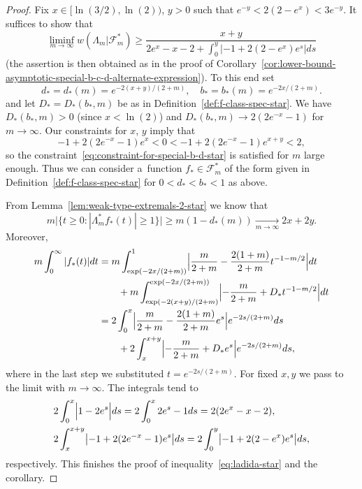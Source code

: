 \documentclass[a4paper]{amsart} %
\theoremstyle{definition}
\theoremstyle{remark}
\numberwithin{equation}{section}
\newcommand*{\weakconstrestricted}[2]{w(#1|#2)} %
\newcommand*{\fclassspecStar}[1]{\mathcal{F}_{#1}^*}
\newcommand*{\fStar}{f_{*}}
\newcommand*{\bStar}{b_*}
\newcommand*{\dStar}{d_*}
\newcommand*{\dOneStar}{D_*}%
\newcommand*{\xStar}{x}
\newcommand*{\yStar}{y}
\begin{document}
\begin{proof}
	Fix $x\in [\ln(3/2), \ln(2))$, $y>0$ such that $e^{-y} < 2(2-e^x) <  3e^{-y}$.
	It suffices to show that
	\begin{equation}
	\label{eq:ladida-star}
	\liminf_{m\to \infty} \weakconstrestricted{\Lambda_m}{\fclassspecStar{m}}
	\geq 	\frac{x + y }{2e^x - x -2+\int_0^y |-1 + 2(2-e^x) e^s | ds}
	\end{equation}
    (the assertion is then obtained as in the proof of Corollary~\ref{cor:lower-bound-asymptotic-special-b-c-d-alternate-expression}).
	To this end set
	\begin{equation*}
	\dStar = \dStar(m) = e^{-2(\xStar+\yStar)/(2+m)},\quad
	\bStar = \bStar(m) = e^{-2\xStar/(2+m)}.
	\end{equation*}
	and let $\dOneStar = \dOneStar(\bStar,m)$ be as in Definition~\ref{def:f-class-spec-star}.
	We have $\dOneStar(\bStar,m) > 0$ (since $x<\ln(2)$)
	and
	$\dOneStar(\bStar,m)\to 2(2e^{-x} -1)$ for $m\to\infty$.
	Our constraints for $x$, $y$ imply that
	\begin{equation*}
	-1 + 2(2e^{-x} - 1) e^x < 0 <  -1 + 2(2e^{-x} - 1) e^{x+y} < 2,
	\end{equation*}	
	so the constraint~\eqref{eq:constraint-for-special-b-d-star} is satisfied for $m$ large enough.
	Thus we can consider a~function $\fStar\in\fclassspecStar{m}$ of the form given in Definition~\ref{def:f-class-spec-star}
	for $0 < \dStar < \bStar  <1$ as above.
	
	
	From Lemma~\ref{lem:weak-type-extremals-2-star} we know that 
	\begin{equation*}
	m\bigl|\{ t\geq 0 : |\Lambda_m^* \fStar (t)| \geq 1 \} \bigr| 
	\geq m(1-\dStar(m)) \xrightarrow[m\to\infty]{} 2x + 2y. 
	\end{equation*}
	Moreover,
	\begin{align*}
	m \int_0^\infty |\fStar(t)| dt 
	&=m\int^1_{\exp(-2x/(2+m))} \Bigl| \frac{m}{2+m} -  \frac{2(1+m)}{2+m}  t^{-1-m/2}\Bigr| dt\\
	&\qquad  
	+ m\int^{\exp(-2x/(2+m))}_{\exp(-2(x+y)/(2+m)} \Bigl| -\frac{m}{2+m} + \dOneStar t^{-1-m/2}\Bigr| dt\nonumber\\
	&= 2 \int_{0}^{x} \Bigl| \frac{m}{2+m} - \frac{2(1+m)}{2+m} e^{s} \Bigr| e^{-2s/(2+m)} ds \\
	&\qquad	+  2\int_{x}^{x+y} \Bigl| -\frac{m}{2+m} + \dOneStar e^{s} \Bigr| e^{-2s/(2+m)} ds,
	\end{align*}
	where in the last step we substituted $t = e^{-2s/(2+m)}$.
	For fixed $x, y$ we pass to the limit with $m\to\infty$.
	The integrals tend to
	\begin{align*}
	&2\int_{0}^{x} \Bigl| 1 - 2 e^{s}\Bigr| ds    
	=  2\int_{0}^{x} 2 e^{s} -1 ds  
	= 2(2e^{x} -x - 2),\\
	&2 \int_{x }^{x+y} \bigl| -1 +  2(2 e^{-x } -1)  e^{s}\bigr| ds
	= 2\int_{0 }^{y} \bigl| -1 +  2(2-e^x) e^{s}\bigr| ds,
	\end{align*}
	respectively.
	This finishes the proof of inequality~\eqref{eq:ladida-star} and the corollary.
	\end{proof}
\end{document}
